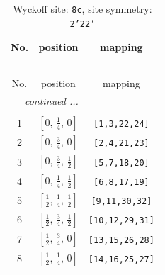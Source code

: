 \documentclass[fleqn,8pt]{jsarticle}
\begin{document}
\begin{longtable}{ccc}
\caption{Wyckoff site: {\tt 8c}, site symmetry: {\tt 2'22'}}
 \\
 \hline \hline
No. & position & mapping \\ \hline \endfirsthead

\multicolumn{2}{l}{\tablename\ \thetable{}} \\
 \hline \hline
No. & position & mapping \\ \hline \endhead

 \hline \hline
\multicolumn{2}{r}{\footnotesize\it continued ...} \\ \endfoot

 \hline \hline
\multicolumn{2}{r}{} \\ \endlastfoot

1 & $\left[ 0,\, \frac{1}{4},\, 0 \right]$ & {\tt [1,3,22,24]} \\ \hline
2 & $\left[ 0,\, \frac{3}{4},\, 0 \right]$ & {\tt [2,4,21,23]} \\ \hline
3 & $\left[ 0,\, \frac{3}{4},\, \frac{1}{2} \right]$ & {\tt [5,7,18,20]} \\ \hline
4 & $\left[ 0,\, \frac{1}{4},\, \frac{1}{2} \right]$ & {\tt [6,8,17,19]} \\ \hline
5 & $\left[ \frac{1}{2},\, \frac{1}{4},\, \frac{1}{2} \right]$ & {\tt [9,11,30,32]} \\ \hline
6 & $\left[ \frac{1}{2},\, \frac{3}{4},\, \frac{1}{2} \right]$ & {\tt [10,12,29,31]} \\ \hline
7 & $\left[ \frac{1}{2},\, \frac{3}{4},\, 0 \right]$ & {\tt [13,15,26,28]} \\ \hline
8 & $\left[ \frac{1}{2},\, \frac{1}{4},\, 0 \right]$ & {\tt [14,16,25,27]} \\
\end{longtable}
\renewcommand{\arraystretch}{1.2}
\end{document}
